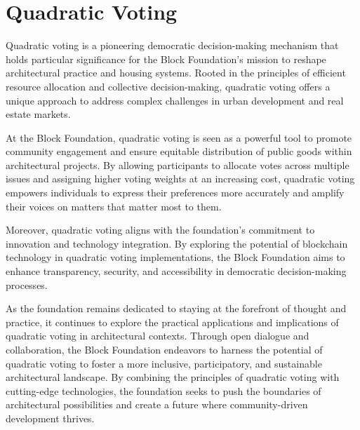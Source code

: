 \section{Quadratic Voting}


Quadratic voting is a pioneering democratic decision-making mechanism that holds particular significance for the Block Foundation's mission to reshape architectural practice and housing systems. Rooted in the principles of efficient resource allocation and collective decision-making, quadratic voting offers a unique approach to address complex challenges in urban development and real estate markets.

At the Block Foundation, quadratic voting is seen as a powerful tool to promote community engagement and ensure equitable distribution of public goods within architectural projects. By allowing participants to allocate votes across multiple issues and assigning higher voting weights at an increasing cost, quadratic voting empowers individuals to express their preferences more accurately and amplify their voices on matters that matter most to them.

Moreover, quadratic voting aligns with the foundation's commitment to innovation and technology integration. By exploring the potential of blockchain technology in quadratic voting implementations, the Block Foundation aims to enhance transparency, security, and accessibility in democratic decision-making processes.

As the foundation remains dedicated to staying at the forefront of thought and practice, it continues to explore the practical applications and implications of quadratic voting in architectural contexts. Through open dialogue and collaboration, the Block Foundation endeavors to harness the potential of quadratic voting to foster a more inclusive, participatory, and sustainable architectural landscape. By combining the principles of quadratic voting with cutting-edge technologies, the foundation seeks to push the boundaries of architectural possibilities and create a future where community-driven development thrives.
